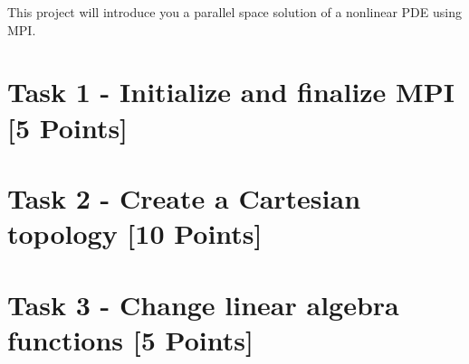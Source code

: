 \documentclass[unicode,11pt,a4paper,oneside,numbers=endperiod,openany]{scrartcl}
\begin{document}
\setassignment
{}

\newline

\assignmentpolicy
This project will introduce you a parallel space solution of a nonlinear PDE using MPI.


\section{Task 1 - Initialize and finalize MPI [5 Points]}


\section{Task 2 - Create a Cartesian topology [10 Points]}



\section{Task 3 - Change linear algebra functions [5 Points]}

\end{document}
